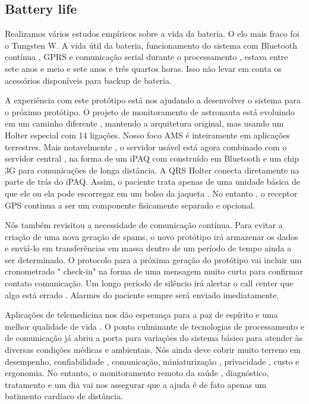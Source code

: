 \documentclass[a4paper,12pt]{article}
\begin{document}
\subsection{Battery life}

Realizamos vários estudos empíricos sobre a vida da bateria. O elo mais fraco foi o Tungsten W. A vida útil da bateria, funcionamento do sistema com Bluetooth contínua , GPRS e comunicação serial durante o processamento , estava entre sete anos e meio e sete anos e três quartos horas. Isso não levar em conta os acessórios disponíveis para backup de bateria.

A experiência com este protótipo está nos ajudando a desenvolver o sistema para o próximo protótipo. O projeto de monitoramento de astronauta está evoluindo em um caminho diferente , mantendo a arquitetura original, mas usando um Holter especial com 14 ligações. Nosso foco AMS é inteiramente em aplicações terrestres. Mais notavelmente , o servidor usável está agora combinado com o servidor central , na forma de um iPAQ com construído em Bluetooth e um chip 3G para comunicações de longa distância. A QRS Holter conecta diretamente na parte de trás do iPAQ. Assim, o paciente trata apenas de uma unidade básica de que ele ou ela pode escorregar em um bolso da jaqueta . No entanto , o receptor GPS continua a ser um componente fisicamente separado e opcional.

Nós também revisitou a necessidade de comunicação contínua. Para evitar a criação de uma nova geração de spams, o novo protótipo irá armazenar os dados e enviá-lo em transferências em massa dentro de um período de tempo ainda a ser determinado. O protocolo para a próxima geração do protótipo vai incluir um cronometrado " check-in" na forma de uma mensagem muito curta para confirmar contato comunicação. Um longo período de silêncio irá alertar o call center que algo está errado . Alarmes do paciente sempre será enviado imediatamente.

Aplicações de telemedicina nos dão esperança para a paz de espírito e uma melhor qualidade de vida . O ponto culminante de tecnologias de processamento e de comunicação já abriu a porta para variações do sistema básico para atender às diversas condições médicas e ambientais. Nós ainda deve cobrir muito terreno em desempenho, confiabilidade , comunicação, miniaturização , privacidade , custo e ergonomia. No entanto, o monitoramento remoto da saúde , diagnóstico, tratamento e um dia vai nos assegurar que a ajuda é de fato apenas um batimento cardíaco de distância.
\end{document}
